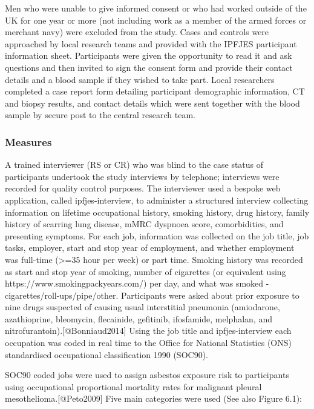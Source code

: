 Men who were unable to give informed consent or who had worked outside
of the UK for one year or more (not including work as a member of the
armed forces or merchant navy) were excluded from the study. Cases and
controls were approached by local research teams and provided with the
IPFJES participant information sheet. Participants were given the
opportunity to read it and ask questions and then invited to sign the
consent form and provide their contact details and a blood sample if
they wished to take part. Local researchers completed a case report form
detailing participant demographic information, CT and biopsy results,
and contact details which were sent together with the blood sample by
secure post to the central research team.

\hypertarget{measures}{%
\subsubsection{Measures}\label{measures}}

A trained interviewer (RS or CR) who was blind to the case status of
participants undertook the study interviews by telephone; interviews
were recorded for quality control purposes. The interviewer used a
bespoke web application, called ipfjes-interview, to administer a
structured interview collecting information on lifetime occupational
history, smoking history, drug history, family history of scarring lung
disease, mMRC dyspnoea score, comorbidities, and presenting symptoms.
For each job, information was collected on the job title, job tasks,
employer, start and stop year of employment, and whether employment was
full-time (\textgreater=35 hour per week) or part time. Smoking history
was recorded as start and stop year of smoking, number of cigarettes (or
equivalent using https://www.smokingpackyears.com/) per day, and what
was smoked - cigarettes/roll-ups/pipe/other. Participants were asked
about prior exposure to nine drugs suspected of causing usual
interstitial pneumonia (amiodarone, azathioprine, bleomycin, flecainide,
gefitinib, ifosfamide, melphalan, and
nitrofurantoin).{[}@Bonniaud2014{]} Using the job title and
ipfjes-interview each occupation was coded in real time to the Office
for National Statistics (ONS) standardised occupational classification
1990 (SOC90).

SOC90 coded jobs were used to assign asbestos exposure risk to
participants using occupational proportional mortality rates for
malignant pleural mesothelioma.{[}@Peto2009{]} Five main categories were
used (See also Figure 6.1):

